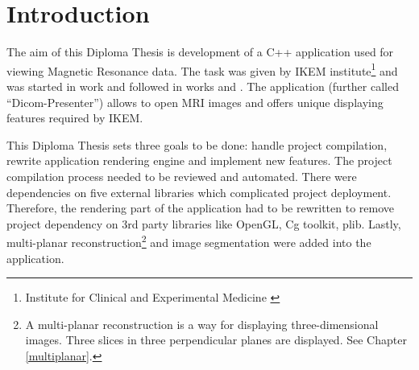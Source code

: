 \chapter{Introduction}
\vspace{-10mm}
The aim of this Diploma Thesis is development of a C++ application used for viewing Magnetic Resonance data. The task was given by IKEM institute\footnote{Institute for Clinical and Experimental Medicine \cite{ikem}} and was started in work \cite{neskudla} and followed in works \cite{flaska_bc} and \cite{flaska_vu}. The application (further called ``Dicom-Presenter'') allows to open MRI images and offers unique displaying features required by IKEM.

This Diploma Thesis sets three goals to be done: handle project compilation, rewrite application rendering engine and implement new features. The project compilation process needed to be reviewed and automated. There were dependencies on five external libraries which complicated project deployment. Therefore, the rendering part of the application had to be rewritten to remove project dependency on 3rd party libraries like OpenGL, Cg toolkit, plib. Lastly, multi-planar reconstruction\footnote{A multi-planar reconstruction is a way for displaying three-dimensional images. Three slices in three perpendicular planes are displayed. See Chapter \ref{multiplanar}.} and image segmentation were added into the application.
